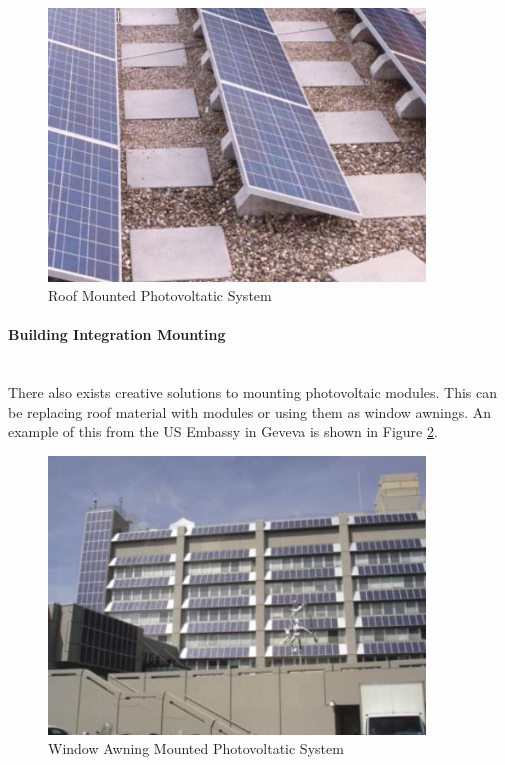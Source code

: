 \begin{figure}[H]
	\hfill\includegraphics[width = 100mm]{images/pv-roof-mounting}\hspace*{\fill}
	\caption{Roof Mounted Photovoltatic System \cite{Haberlin2012}} 
	\label{fig:pv-mounting-fixed-roof}
\end{figure}  

\paragraph{Building Integration Mounting}
~\\
There also exists creative solutions to mounting photovoltaic modules. This can be replacing roof material with modules or using them as window awnings. An example of this from the US Embassy in Geveva is shown in Figure \ref{fig:pv-mounting-fixed-windows}.  
	
\begin{figure}[H]
	\hfill\includegraphics[width = 100mm]{images/pv-mouting-windows}\hspace*{\fill}
	\caption{Window Awning Mounted Photovoltatic System \cite{Haberlin2012}} 
	\label{fig:pv-mounting-fixed-windows}
\end{figure} 

